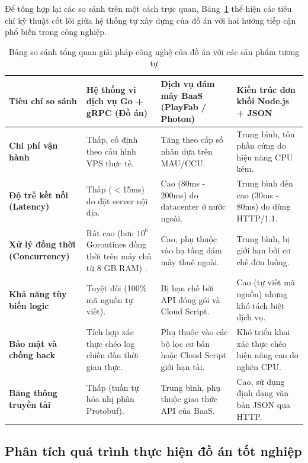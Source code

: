 \documentclass[../Project.tex]{subfiles}
\begin{document}
Để tổng hợp lại các so sánh trên một cách trực quan, Bảng~\ref{tab:comparison_summary} thể hiện các tiêu chí kỹ thuật cốt lõi giữa hệ thống tự xây dựng của đồ án với hai hướng tiếp cận phổ biến trong công nghiệp.

\begin{table}[H]
\centering
\begin{tabular}{|p{2.0cm}|p{3.7cm}|p{3.7cm}|p{3.7cm}|}
\hline
\textbf{Tiêu chí so sánh} & \textbf{Hệ thống vi dịch vụ Go + gRPC (Đồ án)} & \textbf{Dịch vụ đám mây BaaS (PlayFab / Photon)} & \textbf{Kiến trúc đơn khối Node.js + JSON} \\ \hline
\textbf{Chi phí vận hành} & Thấp, cố định theo cấu hình VPS thực tế. & Tăng theo cấp số nhân dựa trên MAU/CCU. & Trung bình, tốn phần cứng do hiệu năng CPU kém. \\ \hline
\textbf{Độ trễ kết nối (Latency)} & Thấp ($<$15ms) do đặt server nội địa. & Cao (80ms - 200ms) do datacenter ở nước ngoài. & Trung bình đến cao (30ms - 80ms) do dùng HTTP/1.1. \\ \hline
\textbf{Xử lý đồng thời (Concurrency)} & Rất cao (hơn $10^6$ Goroutines đồng thời trên máy chủ từ 8 GB RAM) \cite{donovan2015go}. & Cao, phụ thuộc vào hạ tầng đám mây thuê ngoài. & Trung bình, bị giới hạn bởi cơ chế đơn luồng. \\ \hline
\textbf{Khả năng tùy biến logic} & Tuyệt đối (100\% mã nguồn tự viết). & Bị hạn chế bởi API đóng gói và Cloud Script. & Cao (tự viết mã nguồn) nhưng khó tách biệt dịch vụ. \\ \hline
\textbf{Bảo mật và chống hack} & Tích hợp xác thực chéo log chiến đấu thời gian thực. & Phụ thuộc vào các bộ lọc cơ bản hoặc Cloud Script giới hạn tải. & Khó triển khai xác thực chéo hiệu năng cao do nghẽn CPU. \\ \hline
\textbf{Băng thông truyền tải} & Thấp (tuần tự hóa nhị phân Protobuf). & Trung bình, phụ thuộc giao thức API của BaaS. & Cao, sử dụng định dạng văn bản JSON qua HTTP. \\ \hline
\end{tabular}
\caption{Bảng so sánh tổng quan giải pháp công nghệ của đồ án với các sản phẩm tương tự}
\label{tab:comparison_summary}
\end{table}

\subsection{Phân tích quá trình thực hiện đồ án tốt nghiệp}
\label{sec:project_analysis}
\end{document}
